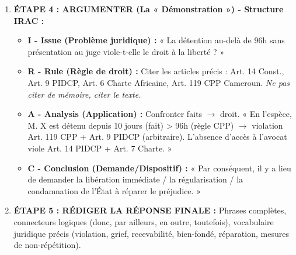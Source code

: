 \documentclass[11pt]{article}
\begin{document}
\begin{methode}
\begin{enumerate}
\begin{itemize}
                \item \textbf{International :} Comités ONU (Communications si Prot. Fac. ratifié - \textbf{Vérifier pour CM : PIDCP OUI (OP1 1984), PIDESC NON, CEDAW OUI (OP-CEDAW 2004), CAT OUI (Art. 22 1987), CIDE OUI (OP3 2013) }), Procédures Spéciales (Appels urgents), EPU (Rapports parallèles).
            \end{itemize}
        \item \textbf{ÉTAPE 4 : ARGUMENTER (La « Démonstration ») - Structure IRAC :}
            \begin{itemize}
                \item \textbf{I - Issue (Problème juridique) :} « La détention au-delà de 96h sans présentation au juge viole-t-elle le droit à la liberté ? »
                \item \textbf{R - Rule (Règle de droit) :} Citer les articles précis : Art. 14 Const., Art. 9 PIDCP, Art. 6 Charte Africaine, Art. 119 CPP Cameroun. \emph{Ne pas citer de mémoire, citer le texte.}
                \item \textbf{A - Analysis (Application) :} Confronter faits $\rightarrow$ droit. « En l'espèce, M. X est détenu depuis 10 jours (fait) > 96h (règle CPP) $\rightarrow$ violation Art. 119 CPP + Art. 9 PIDCP (arbitraire). L'absence d'accès à l'avocat viole Art. 14 PIDCP + Art. 7 Charte. »
                \item \textbf{C - Conclusion (Demande/Dispositif) :} « Par conséquent, il y a lieu de demander la libération immédiate / la régularisation / la condamnation de l'État à réparer le préjudice. »
            \end{itemize}
        \item \textbf{ÉTAPE 5 : RÉDIGER LA RÉPONSE FINALE :} Phrases complètes, connecteurs logiques (donc, par ailleurs, en outre, toutefois), vocabulaire juridique précis (violation, grief, recevabilité, bien-fondé, réparation, mesures de non-répétition).
    \end{enumerate}
\end{methode}
\end{document}
